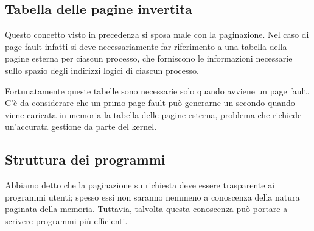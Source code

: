    \subsection{Tabella delle pagine invertita}
        Questo concetto visto in precedenza si sposa male con la paginazione. Nel caso di page fault infatti si deve necessariamente far riferimento a una tabella della pagine esterna per ciascun processo, che forniscono le informazioni necessarie sullo spazio degli indirizzi logici di ciascun processo.
        
        Fortunatamente queste tabelle sono necessarie solo quando avviene un page fault. C'è da considerare che un primo page fault può generarne un secondo quando viene caricata in memoria la tabella delle pagine esterna, problema che richiede un'accurata gestione da parte del kernel.
        
    \subsection{Struttura dei programmi}
        Abbiamo detto che la paginazione su richiesta deve essere trasparente ai programmi utenti; spesso essi non saranno nemmeno a conoscenza della natura paginata della memoria. Tuttavia, talvolta questa conoscenza può portare a scrivere programmi più efficienti.